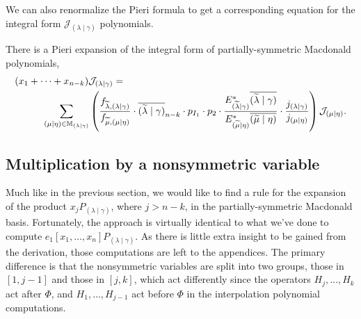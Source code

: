 \documentclass[ALCO]{cedram}
\newcommand{\Estar}[1]{E^*_{#1}}
\newcommand{\Pn}{P_{(\lambda \mid \gamma)}}
\newcommand{\JJ}{\mathcal{J}_{(\lambda \mid \gamma)}}
\newcommand{\MMM}{\mathbb{M}_{\lambdagamma}}
\newcommand{\nudom}{{( \lambda \mid \gamma )}}
\newcommand{\lambdagamma}{{\nudom}}
\newcommand{\mueta}{{(\mu \mid \eta)}}
\newcommand{\mutilde}{{\widetilde{\mu}}}
\newcommand{\lambdatilde}{{\widetilde{\lambda}}}
\newcommand{\lambdatildegamma}{{(\lambdatilde \mid \gamma)}}
\newcommand{\mutildeeta}{{(\mutilde \mid \eta)}}
\begin{document}
We can also renormalize the Pieri formula to get a corresponding equation for the integral form $\JJ$ polynomials.

\begin{coro}\label{Jpieri}
 There is a Pieri expansion of the integral form of partially-symmetric Macdonald polynomials,
\begin{align*} &(x_1 + \dots + x_{n-k})\JJ = \\  & \hspace*{1cm}\sum_{\mueta \in \MMM} \left(  \frac{f_{\lambdatilde,\lambdagamma}}{f_{\mutilde,\mueta}} \cdot \overline{\lambdatildegamma}_{n-k} \cdot p_{I_1} \cdot p_{2}\cdot \frac{\Estar{\lambdatildegamma}\overline{\lambdatildegamma}}{\Estar{\mutildeeta}\overline{\mutildeeta}} \cdot \frac{ j_{\lambdagamma}}{j_{\mueta}} \right) \mathcal{J}_{\mueta}. \end{align*}
\end{coro}


    
\subsection{Multiplication by a nonsymmetric variable}

Much like in the previous section, we would like to find a rule for the expansion of the product $x_j P_\lambdagamma$, where $j>n-k$, in the partially-symmetric Macdonald basis. Fortunately, the approach is virtually identical to what we've done to compute $e_1[x_1, \dotsc, x_n] \Pn$. As there is little extra insight to be gained from the derivation, those computations are left to the appendices. The primary difference is that the nonsymmetric variables are split into two groups, those in $[1,j-1]$ and those in $[j,k]$, which act differently since the operators $H_j, \dotsc, H_k$ act after $\Phi$, and $H_1, \dotsc, H_{j-1}$ act before $\Phi$ in the interpolation polynomial computations.
\end{document}
